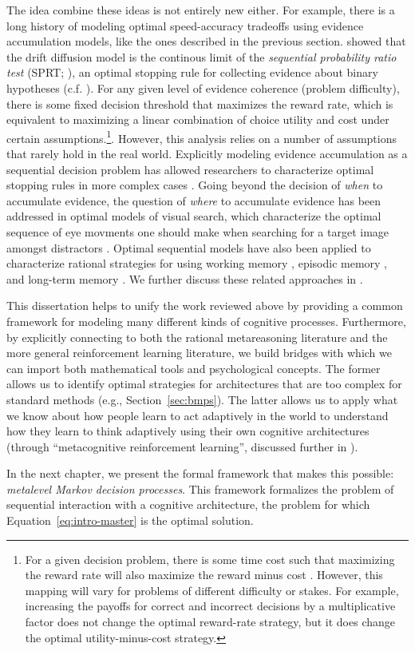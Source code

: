 The idea combine these ideas is not entirely new either. For example, there is a long history of modeling optimal speed-accuracy tradeoffs using evidence accumulation models, like the ones described in the previous section. \citet{bogacz2006physics} showed that the drift diffusion model is the continous limit of the \emph{sequential probability ratio test} (SPRT; \citealp{wald1945sequential}), an optimal stopping rule for collecting evidence about binary hypotheses (c.f. \citealp{gold2002banburismus}). For any given level of evidence coherence (problem difficulty), there is some fixed decision threshold that maximizes the reward rate, which is equivalent to maximizing a linear combination of choice utility and cost under certain assumptions.\footnote{
  For a given decision problem, there is some time cost such that maximizing the reward rate will also maximize the reward minus cost \citep{wald1948optimum,drugowitsch2012cost}. However, this mapping will vary for problems of different difficulty or stakes. For example, increasing the payoffs for correct and incorrect decisions by a multiplicative factor does not change the optimal reward-rate strategy, but it does change the optimal utility-minus-cost strategy.
}. However, this analysis relies on a number of assumptions that rarely hold in the real world. Explicitly modeling evidence accumulation as a sequential decision problem has allowed researchers to characterize optimal stopping rules in more complex cases \citep{drugowitsch2012cost,fudenberg2018speed,tajima2019optimal}. Going beyond the decision of \emph{when} to accumulate evidence, the question of \emph{where} to accumulate evidence has been addressed in optimal models of visual search, which characterize the optimal sequence of eye movments one should make when searching for a target image amongst distractors \citep{butko2008ipomdp,acharya2017human,hoppe2019multistep}. Optimal sequential models have also been applied to characterize rational strategies for using working memory \citep{todd2008learning}, episodic memory \citep{lu2022neural}, and long-term memory \citep{zhang2022optimal}. We further discuss these related approaches in \conclusion.

This dissertation helps to unify the work reviewed above by providing a common framework for modeling many different kinds of cognitive processes. Furthermore, by explicitly connecting to both the rational metareasoning literature and the more general reinforcement learning literature, we build bridges with which we can import both mathematical tools and psychological concepts. The former allows us to identify optimal strategies for architectures that are too complex for standard methods (e.g., Section~\ref{sec:bmps}). The latter allows us to apply what we know about how people learn to act adaptively in the world to understand how they learn to think adaptively using their own cognitive architectures (through ``metacognitive reinforcement learning'', discussed further in \conclusion).

In the next chapter, we present the formal framework that makes this possible:  \emph{metalevel Markov decision processes}. This framework formalizes the problem of sequential interaction with a cognitive architecture, the problem for which Equation~\ref{eq:intro-master} is the optimal solution.
